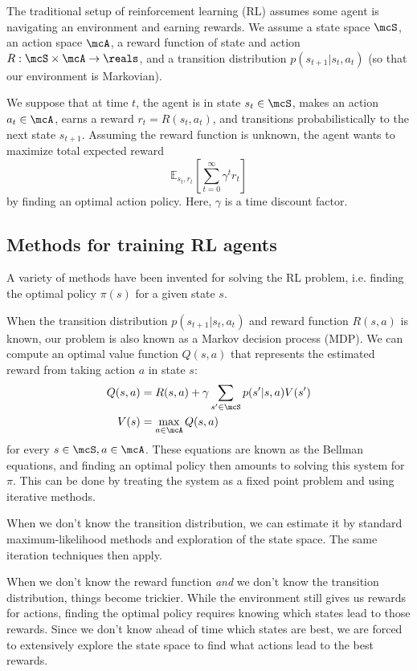 \documentclass[11pt]{report}
\begin{document}
The traditional setup of reinforcement learning (RL) assumes some agent is navigating an environment and earning rewards.
We assume a state space $\mcS$, an action space $\mcA$, a reward function of state and action $R : \mcS \times \mcA \to \reals$, and a transition distribution $p(s_{t+1} | s_t, a_t)$ (so that our environment is Markovian).

We suppose that at time $t$, the agent is in state $s_t \in \mcS$, makes an action $a_t \in \mcA$, earns a reward $r_t = R(s_t, a_t)$, and transitions probabilistically to the next state $s_{t+1}$.
Assuming the reward function is unknown, the agent wants to maximize total expected reward
$$\mathbb{E}_{s_t, r_t} [\sum_{t=0}^\infty \gamma^t r_t]$$
by finding an optimal action policy. Here, $\gamma$ is a time discount factor.


\subsection{Methods for training RL agents}

A variety of methods have been invented for solving the RL problem, i.e. finding the optimal policy $\pi(s)$ for a given state $s$.

When the transition distribution $p(s_{t+1} | s_t, a_t)$ and reward function $R(s,a)$ is known, our problem is also known as a Markov decision process (MDP). We can compute an optimal value function $Q(s, a)$ that represents the estimated reward from taking action $a$ in state $s$:
\begin{align}
Q(s, a) & = R(s, a) + \gamma \sum_{s' \in \mcS} p(s' | s, a) V(s') \\
V(s) &= \max_{a \in \mcA} Q(s,a)
\end{align}
for every $s \in \mcS, a \in \mcA$. These equations are known as the Bellman equations, and finding an optimal policy then amounts to solving this system for $\pi$. This can be done by treating the system as a fixed point problem and using iterative methods. %

When we don't know the transition distribution, we can estimate it by standard maximum-likelihood methods and exploration of the state space. The same iteration techniques then apply.

When we don't know the reward function \emph{and} we don't know the transition distribution, things become trickier. While the environment still gives us rewards for actions, finding the optimal policy requires knowing which states lead to those rewards.
Since we don't know ahead of time which states are best, we are forced to extensively explore the state space to find what actions lead to the best rewards.
\end{document}
